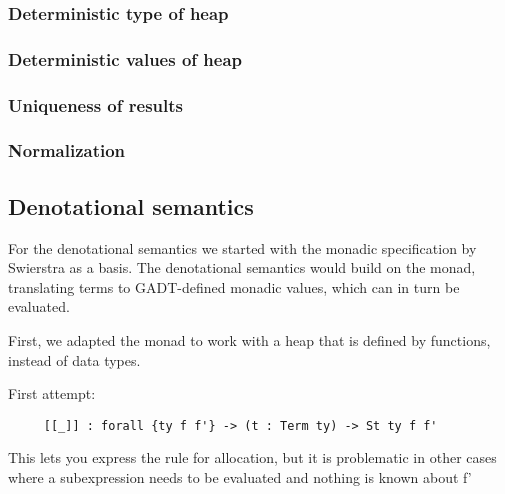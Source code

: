 \documentclass{article}
\begin{document}

\subsubsection{Deterministic type of heap}


\subsubsection{Deterministic values of heap}


\subsubsection{Uniqueness of results}


\subsubsection{Normalization}


\subsection{Denotational semantics} %

For the denotational semantics we started with the monadic
specification by Swierstra as a basis. The denotational semantics
would build on the monad, translating terms to GADT-defined monadic
values, which can in turn be evaluated.

First, we adapted the monad to work with a heap that is defined by
functions, instead of data types.


First attempt:

\begin{lstlisting}
     [[_]] : forall {ty f f'} -> (t : Term ty) -> St ty f f'
\end{lstlisting}

This lets you express the rule for allocation, but it is problematic
in other cases where a subexpression needs to be evaluated and
nothing is known about f'
\end{document}
